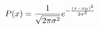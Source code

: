 \documentclass{article}
\begin{document}
\begin{equation}
  P(x)=\frac{1}{\sqrt{2\pi\sigma^2}}e^{-\frac{(x-x_0)^2}{2\sigma^2}}\notag
\end{equation}
\end{document}

